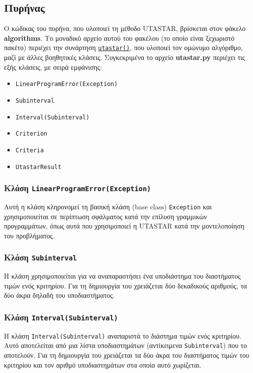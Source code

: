 \documentclass[11pt,a4paper,titlepage]{article}
\numberwithin{equation}{section}
\begin{document}
\subsection{Πυρήνας}
\label{ssec:impl-kernel}
Ο κώδικας του πυρήνα, που υλοποιεί τη μέθοδο UTASTAR, βρίσκεται στον φάκελο \textbf{algorithms}. Το μοναδικό αρχείο αυτού του φακέλου (το οποίο είναι ξεχωριστό πακέτο) περιέχει την συνάρτηση \hyperref[sssec:utastar()]{\texttt{utastar()}}, που υλοποιεί τον ομώνυμο αλγόριθμο, μαζί με άλλες βοηθητικές κλάσεις. Συγκεκριμένα το αρχείο \textbf{utastar.py} περιέχει τις εξής κλάσεις, με σειρά εμφάνισης:

\begin{itemize}
    \item \texttt{LinearProgramError(Exception)}
    \item \texttt{Subinterval}
    \item \texttt{Interval(Subinterval)}
    \item \texttt{Criterion}
    \item \texttt{Criteria}
    \item \texttt{UtastarResult}
\end{itemize}

\subsubsection{Κλάση \texttt{LinearProgramError(Exception)}}
\label{sssec:LinearProgramError}
Αυτή η κλάση κληρονομεί τη βασική κλάση (base class) \texttt{Exception} και χρησιμοποιείται σε περίπτωση σφάλματος κατά την επίλυση γραμμικών προγραμμάτων, όπως αυτά που χρησιμοποιεί η UTASTAR κατά την μοντελοποίηση του προβλήματος.

\subsubsection{Κλάση \texttt{Subinterval}}
\label{sssec:Subinterval}
Η κλάση χρησιμοποιείται για να αναπαραστήσει ένα υποδιάστημα του διαστήματος τιμών ενός κριτηρίου. Για τη δημιουργία του χρειάζεται δύο δεκαδικούς αριθμούς, τα δύο άκρα δηλαδή του υποδιαστήματος.

\subsubsection{Κλάση \texttt{Ιnterval(Subinterval)}}
\label{sssec:Ιnterval}
Η κλάση \texttt{Ιnterval(Subinterval)} αναπαριστά το διάστημα τιμών ενός κριτηρίου. Αυτό αποτελείται από μια λίστα υποδιαστημάτων (αντίκειμενα \texttt{Subinterval}) που το αποτελούν. Για τη δημιουργία του χρειάζεται τα δύο άκρα του διαστήματος τιμών του κριτηρίου και τον αριθμό υποδιαστημάτων στα οποία αυτό χωρίζεται.
\end{document}
